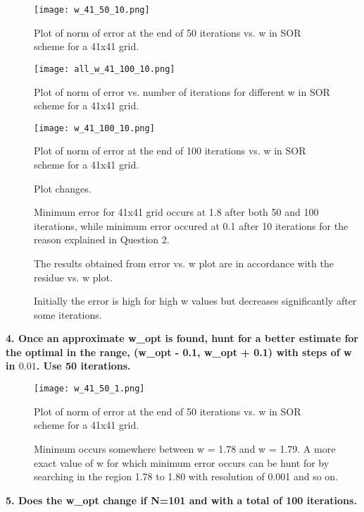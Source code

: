 \documentclass{article}
\begin{document}
\begin{figure}[H] \label{figure}
\texttt{[image: w\_41\_50\_10.png]}
\caption{Plot of norm of error at the end of 50 iterations vs. w in SOR scheme for a 41x41 grid.}
\label{figure:}
\end{figure}

\begin{figure}[H] \label{figure}
\texttt{[image: all\_w\_41\_100\_10.png]}
\caption{Plot of norm of error vs. number of iterations for different w in SOR scheme for a 41x41 grid.}
\label{figure:}
\end{figure}

\begin{figure}[H] \label{figure}
\texttt{[image: w\_41\_100\_10.png]}
\caption{Plot of norm of error at the end of 100 iterations vs. w in SOR scheme for a 41x41 grid.}
\label{figure:}
\end{figure}

\begin{description}
\item[]Plot changes.
\item[]Minimum error for 41x41 grid occurs at 1.8 after both 50 and 100 iterations, while minimum error occured at 0.1 after 10 iterations for the reason explained in Question 2.
\item[]The results obtained from error vs. w plot are in accordance with the residue vs. w plot.
\item[]Initially the error is high for high w values but decreases significantly after some iterations.
\end{description}

\newpage
\textbf{4. Once an approximate w\_opt is found, hunt for a better estimate for the optimal in the range, (w\_opt - 0.1, w\_opt + 0.1) with steps of w in $0.01$. Use 50 iterations.}

\begin{figure}[H] \label{figure}
\texttt{[image: w\_41\_50\_1.png]}
\caption{Plot of norm of error at the end of 50 iterations vs. w in SOR scheme for a 41x41 grid.}
\label{figure:}
\end{figure}

\begin{description}
\item[]Minimum occurs somewhere between w = 1.78 and w = 1.79. A more exact value of w for which minimum error occurs can be hunt for by searching in the region 1.78 to 1.80 with resolution of 0.001 and so on.

\end{description}
\newpage
\textbf{5. Does the w\_opt change if N=101 and with a total of 100 iterations.}
\end{document}
